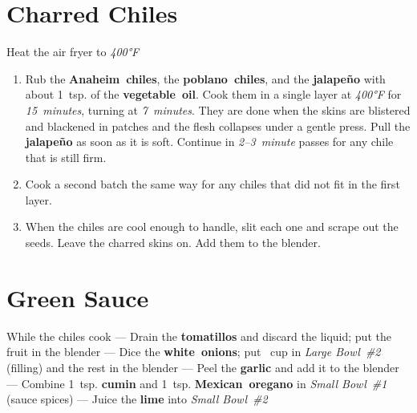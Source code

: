 \documentclass[11pt,letterpaper]{article}
\begin{document}
\filbreak
\section*{Charred Chiles}

\noindent
Heat the air fryer to \textit{400°F}

\begin{enumerate}
    \item Rub the \textbf{Anaheim~chiles}, the \textbf{poblano~chiles}, and the \textbf{jalapeño} with about 1~tsp. of the \textbf{vegetable~oil}. Cook them in a single layer at \textit{400°F} for \textit{15~minutes}, turning at \textit{7~minutes}. They are done when the skins are blistered and blackened in patches and the flesh collapses under a gentle press. Pull the \textbf{jalapeño} as soon as it is soft. Continue in \textit{2--3~minute} passes for any chile that is still firm.

    \item Cook a second batch the same way for any chiles that did not fit in the first layer.

    \item When the chiles are cool enough to handle, slit each one and scrape out the seeds. Leave the charred skins on. Add them to the blender.
\end{enumerate}

\filbreak
\section*{Green Sauce}

\noindent
While the chiles cook ---
Drain the \textbf{tomatillos} and discard the liquid; put the fruit in the blender ---
Dice the \textbf{white~onions}; put ~cup in \textit{Large Bowl~\#2} (filling) and the rest in the blender ---
Peel the \textbf{garlic} and add it to the blender ---
Combine 1~tsp. \textbf{cumin} and 1~tsp. \textbf{Mexican~oregano} in \textit{Small Bowl~\#1} (sauce spices) ---
Juice the \textbf{lime} into \textit{Small Bowl~\#2}
\end{document}
